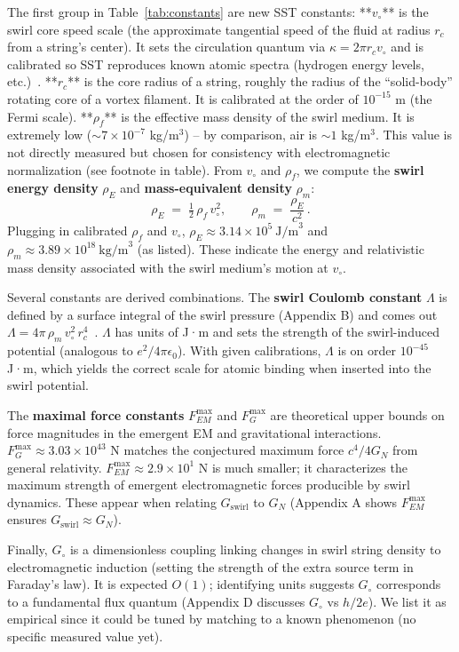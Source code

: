 \documentclass[aps,onecolumn,10pt,nofootinbib]{revtex4}
\newcommand{\rhoE}{\rho_{E}}
\newcommand{\rhom}{\rho_{m}}
\begin{document}
	The first group in Table~\ref{tab:constants} are new SST constants:
	**$v_{\circ}$** is the swirl core speed scale (the approximate tangential speed of the fluid at radius $r_c$ from a string’s center). It sets the circulation quantum via $\kappa = 2\pi r_c v_{\circ}$ and is calibrated so SST reproduces known atomic spectra (hydrogen energy levels, etc.)~\cite{index51}.
	**$r_c$** is the core radius of a string, roughly the radius of the “solid-body” rotating core of a vortex filament. It is calibrated at the order of $10^{-15}$ m (the Fermi scale).
	**$\rho_f$** is the effective mass density of the swirl medium. It is extremely low ($\sim\!7\times10^{-7}$ kg/m$^3$) – by comparison, air is $\sim1$ kg/m$^3$. This value is not directly measured but chosen for consistency with electromagnetic normalization (see footnote in table). From $v_{\circ}$ and $\rho_f$, we compute the \textbf{swirl energy density} $\rhoE$ and \textbf{mass-equivalent density} $\rhom$:
	\[
		\rhoE \;=\; \tfrac{1}{2}\,\rho_f\,v_{\circ}^2, \qquad
		\rhom \;=\; \frac{\rhoE}{c^2}\,.
	\]
	Plugging in calibrated $\rho_f$ and $v_{\circ}$, $\rhoE \approx 3.14\times10^{5}~\text{J/m}^3$ and $\rho_m \approx 3.89\times10^{18}~\text{kg/m}^3$ (as listed). These indicate the energy and relativistic mass density associated with the swirl medium’s motion at $v_{\circ}$.

	Several constants are derived combinations. The \textbf{swirl Coulomb constant} $\Lambda$ is defined by a surface integral of the swirl pressure (Appendix B) and comes out $\Lambda = 4\pi\,\rho_m\,v_{\circ}^2\,r_c^4$~\cite{index52}. $\Lambda$ has units of J·m and sets the strength of the swirl-induced potential (analogous to $e^2/4\pi\epsilon_0$). With given calibrations, $\Lambda$ is on order $10^{-45}$ J·m, which yields the correct scale for atomic binding when inserted into the swirl potential.

	The \textbf{maximal force constants} $F_{\!EM}^{\max}$ and $F_{\!G}^{\max}$ are theoretical upper bounds on force magnitudes in the emergent EM and gravitational interactions. $F_{\!G}^{\max}\approx3.03\times10^{43}$ N matches the conjectured maximum force $c^4/4G_N$ from general relativity. $F_{\!EM}^{\max}\approx2.9\times10^1$ N is much smaller; it characterizes the maximum strength of emergent electromagnetic forces producible by swirl dynamics. These appear when relating $G_{\text{swirl}}$ to $G_N$ (Appendix A shows $F_{\!EM}^{\max}$ ensures $G_{\text{swirl}}\approx G_N$).

	Finally, $G_{\circ}$ is a dimensionless coupling linking changes in swirl string density to electromagnetic induction (setting the strength of the extra source term in Faraday’s law). It is expected $O(1)$; identifying units suggests $G_{\circ}$ corresponds to a fundamental flux quantum (Appendix D discusses $G_{\circ}$ vs $h/2e$). We list it as empirical since it could be tuned by matching to a known phenomenon (no specific measured value yet).
\end{document}
